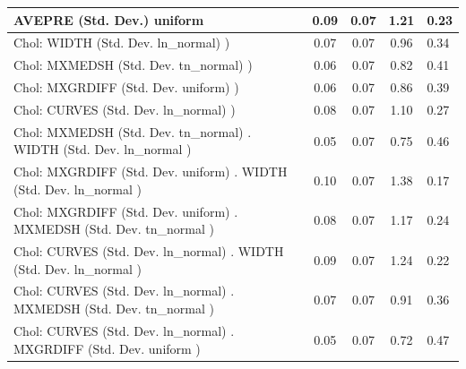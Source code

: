 \begin{table}
\begin{center}
\begin{tabular}{|l|l|c|c|c|l|}
			\hline
			AVEPRE (Std. Dev.) uniform &  & 0.09 & 0.07 & 1.21 & 0.23 \\
			\hline
			 Chol: WIDTH (Std. Dev. ln_normal) ) &  & 0.07 & 0.07 & 0.96 & 0.34 \\
			\hline
			 Chol: MXMEDSH (Std. Dev. tn_normal) ) &  & 0.06 & 0.07 & 0.82 & 0.41 \\
			\hline
			 Chol: MXGRDIFF (Std. Dev. uniform) ) &  & 0.06 & 0.07 & 0.86 & 0.39 \\
			\hline
			 Chol: CURVES (Std. Dev. ln_normal) ) &  & 0.08 & 0.07 & 1.10 & 0.27 \\
			\hline
			 Chol: MXMEDSH (Std. Dev. tn_normal) . WIDTH (Std. Dev.   ln_normal ) &  & 0.05 & 0.07 & 0.75 & 0.46 \\
			\hline
			 Chol: MXGRDIFF (Std. Dev. uniform) . WIDTH (Std. Dev.   ln_normal ) &  & 0.10 & 0.07 & 1.38 & 0.17 \\
			\hline
			 Chol: MXGRDIFF (Std. Dev. uniform) . MXMEDSH (Std. Dev.   tn_normal ) &  & 0.08 & 0.07 & 1.17 & 0.24 \\
			\hline
			 Chol: CURVES (Std. Dev. ln_normal) . WIDTH (Std. Dev.   ln_normal ) &  & 0.09 & 0.07 & 1.24 & 0.22 \\
			\hline
			 Chol: CURVES (Std. Dev. ln_normal) . MXMEDSH (Std. Dev.   tn_normal ) &  & 0.07 & 0.07 & 0.91 & 0.36 \\
			\hline
			 Chol: CURVES (Std. Dev. ln_normal) . MXGRDIFF (Std. Dev.   uniform ) &  & 0.05 & 0.07 & 0.72 & 0.47 \\
			\hline
		\end{tabular}
	\end{center}
\end{table}